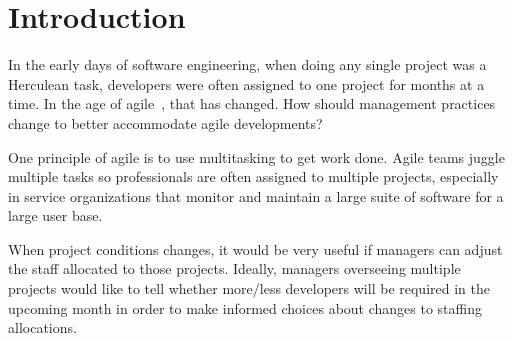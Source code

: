 \documentclass[sigconf, preprint]{acmart}
\begin{document}

\pagestyle{plain}
\section{Introduction}
\label{sect:intro}

In the early days of software engineering, when doing any single project
was a Herculean task,   developers were often assigned to one project for months at  a time.
In the age of agile~\cite{abrahamsson2017agile, 
dybaa2008empirical, misra2009identifying, begel2007usage}, that has changed. How should management practices change to better accommodate agile developments?

One principle of 
agile  is to use multitasking to get work done.
Agile teams juggle multiple tasks so professionals are often    assigned to multiple projects, especially in service organizations that monitor and maintain a large suite of software for a large user base. 


When project conditions
changes, it would be very useful 
if managers can  adjust the
staff allocated to those projects.
Ideally, managers   overseeing multiple projects
would like to tell whether more/less developers will be required in the upcoming month in order to make informed choices about changes to staffing allocations.
\end{document}
